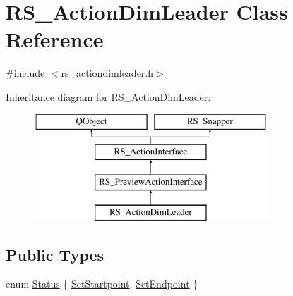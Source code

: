 \hypertarget{classRS__ActionDimLeader}{\section{R\-S\-\_\-\-Action\-Dim\-Leader Class Reference}
\label{classRS__ActionDimLeader}
}


{\ttfamily \#include $<$rs\-\_\-actiondimleader.\-h$>$}

Inheritance diagram for R\-S\-\_\-\-Action\-Dim\-Leader\-:\begin{figure}[H]
\begin{center}
\leavevmode
\includegraphics[height=4.000000cm]{classRS__ActionDimLeader}
\end{center}
\end{figure}
\subsection*{Public Types}
\begin{DoxyCompactItemize}
\item 
enum \hyperlink{classRS__ActionDimLeader_a2b2ce1799909625438473405ce3e25ff}{Status} \{ \hyperlink{classRS__ActionDimLeader_a2b2ce1799909625438473405ce3e25ffa7411e495c561471bbc867b59d3de9137}{Set\-Startpoint}, 
\hyperlink{classRS__ActionDimLeader_a2b2ce1799909625438473405ce3e25ffa6b31b70f1aff3c4f7ef08bbac5319c82}{Set\-Endpoint}
 \}
\end{DoxyCompactItemize}

